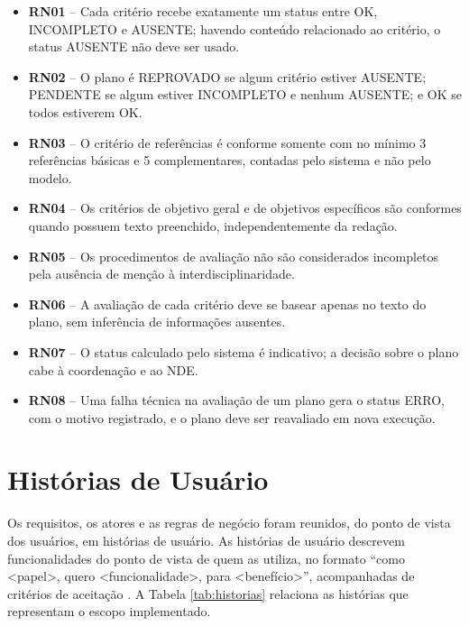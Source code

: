 \begin{itemize}
    \item \textbf{RN01} -- Cada critério recebe exatamente um status entre OK, INCOMPLETO e AUSENTE; havendo conteúdo relacionado ao critério, o status AUSENTE não deve ser usado.
    \item \textbf{RN02} -- O plano é REPROVADO se algum critério estiver AUSENTE; PENDENTE se algum estiver INCOMPLETO e nenhum AUSENTE; e OK se todos estiverem OK.
    \item \textbf{RN03} -- O critério de referências é conforme somente com no mínimo 3 referências básicas e 5 complementares, contadas pelo sistema e não pelo modelo.
    \item \textbf{RN04} -- Os critérios de objetivo geral e de objetivos específicos são conformes quando possuem texto preenchido, independentemente da redação.
    \item \textbf{RN05} -- Os procedimentos de avaliação não são considerados incompletos pela ausência de menção à interdisciplinaridade.
    \item \textbf{RN06} -- A avaliação de cada critério deve se basear apenas no texto do plano, sem inferência de informações ausentes.
    \item \textbf{RN07} -- O status calculado pelo sistema é indicativo; a decisão sobre o plano cabe à coordenação e ao NDE.
    \item \textbf{RN08} -- Uma falha técnica na avaliação de um plano gera o status ERRO, com o motivo registrado, e o plano deve ser reavaliado em nova execução.
\end{itemize}

\section{Histórias de Usuário}
\label{sec:historias}

Os requisitos, os atores e as regras de negócio foram reunidos, do ponto de vista dos usuários, em histórias de usuário. As histórias de usuário descrevem funcionalidades do ponto de vista de quem as utiliza, no formato ``como \textless papel\textgreater, quero \textless funcionalidade\textgreater, para \textless benefício\textgreater'', acompanhadas de critérios de aceitação \cite{Cohn2004}. A Tabela \ref{tab:historias} relaciona as histórias que representam o escopo implementado.

